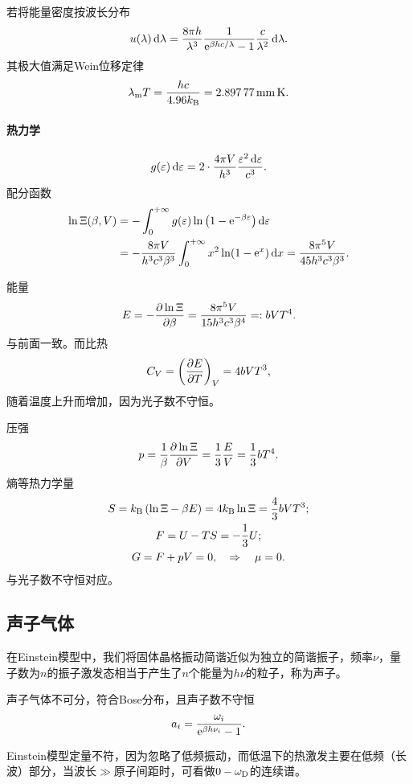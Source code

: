 若将能量密度按波长分布
\[
	u(\lambda)\mathop{}\!\mathrm{d}\lambda=\frac{8\pi h}{\lambda^3}\frac{1}{\mathop{}\!\mathrm{e}^{\beta hc/\lambda}-1}\frac c{\lambda^2}\mathop{}\!\mathrm{d}\lambda.
\]
其极大值满足Wein位移定律
\begin{align}
	\lambda_\mathrm mT=\frac{hc}{4.96\kB}=\SI{2.89777}{\mm\K}.
\end{align}
\paragraph*{热力学}
\[
	g(\varepsilon)\mathop{}\!\mathrm{d}\varepsilon=2\cdot\frac{4\pi V}{h^3}\frac{\varepsilon^2\mathop{}\!\mathrm{d}\varepsilon}{c^3}.
\]
配分函数
\begin{align*}
	\ln\Xi(\beta,V)&=-\int_0^{+\infty} g(\varepsilon)\ln\left(1-\mathop{}\!\mathrm{e}^{-\beta\varepsilon}\right)\mathop{}\!\mathrm{d}\varepsilon\\
	&=-\frac{8\pi V}{h^3c^3\beta^3}\int_0^{+\infty} x^2\ln(1-\mathop{}\!\mathrm{e}^ x)\mathop{}\!\mathrm{d} x=\frac{8\pi^5V}{45h^3c^3\beta^3}.
\end{align*}

能量
\[
	E=-\frac{\partial^{\;\!\!}\ln\Xi}{\partial \beta^{\;\!\!}}=\frac{8\pi^5V}{15h^3c^3\beta^4}=:bVT^4.
\]
与前面一致。而比热
\[
	C_V=\left(\frac{\partial^{\;\!\!}E}{\partial T^{\;\!\!}}\right)_V=4bVT^3,
\]
随着温度上升而增加，因为光子数不守恒。

压强
\[
	p=\frac1\beta\frac{\partial^{\;\!\!}\ln\Xi}{\partial V^{\;\!\!}}=\frac13\frac EV=\frac13bT^4.
\]
熵等热力学量
\begin{gather*}
	S=k_{\mathrm B}\left(\ln\Xi-\beta E\right)=4k_{\mathrm B}\ln\Xi=\frac43bVT^3;\\
	F=U-TS=-\frac13U;\\
	G=F+pV=0,\quad\Rightarrow\quad\mu=0.
\end{gather*}
与光子数不守恒对应。
\subsection{声子气体}
在Einstein模型中，我们将固体晶格振动简谐近似为独立的简谐振子，频率$\nu$，量子数为$n$的振子激发态相当于产生了$n$个能量为$h\nu$的粒子，称为声子。

声子气体不可分，符合Bose分布，且声子数不守恒
\[
	a_i=\frac{\omega_i}{\mathop{}\!\mathrm{e}^{\beta h\nu_i}-1}.
\]

Einstein模型定量不符，因为忽略了低频振动，而低温下的热激发主要在低频（长波）部分，当波长$\gg$原子间距时，可看做$0-\omega_\mathrm D$的连续谱。


